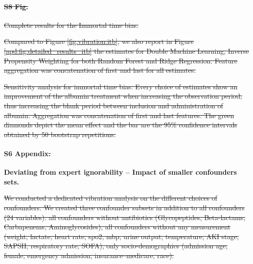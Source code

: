 \documentclass[10pt,letterpaper]{article}
\providecommand{\DIFdeltex}[1]{{\protect\color{red}\sout{#1}}}                      %
\providecommand{\DIFdelbegin}{} %
\providecommand{\DIFdelend}{} %
\providecommand{\DIFdelFL}[1]{\DIFdel{#1}} %
\providecommand{\DIFdel}[1]{\texorpdfstring{\DIFdeltex{#1}}{}} %
\newcommand{\DIFscaledelfig}{0.5}
\newlength{\DIFdelgraphicswidth} %
\newlength{\DIFdelgraphicsheight} %
\newcommand{\DIFdelincludegraphics}[2][]{%
\sbox{\DIFdelgraphicsbox}{\DIFOincludegraphics[#1]{#2}}%
\settoboxwidth{\DIFdelgraphicswidth}{\DIFdelgraphicsbox} %
\settoboxtotalheight{\DIFdelgraphicsheight}{\DIFdelgraphicsbox} %
\scalebox{\DIFscaledelfig}{%
\parbox[b]{\DIFdelgraphicswidth}{\usebox{\DIFdelgraphicsbox}\\[-\baselineskip] \rule{\DIFdelgraphicswidth}{0em}}\llap{\resizebox{\DIFdelgraphicswidth}{\DIFdelgraphicsheight}{%
\setlength{\unitlength}{\DIFdelgraphicswidth}%
\begin{picture}(1,1)%
\thicklines\linethickness{2pt} %
{\color[rgb]{1,0,0}\put(0,0){\framebox(1,1){}}}%
{\color[rgb]{1,0,0}\put(0,0){\line( 1,1){1}}}%
{\color[rgb]{1,0,0}\put(0,1){\line(1,-1){1}}}%
\end{picture}%
}\hspace*{3pt}}} %
} %
\DeclareRobustCommand{\DIFdelbegin}{\DIFOdelbegin \let\includegraphics\DIFdelincludegraphics} %
\DeclareRobustCommand{\DIFdelend}{\DIFOaddend \let\includegraphics\DIFOincludegraphics} %
\begin{document}
\paragraph*{\DIFdel{S8 Fig.}}
\DIFdel{Complete results for the Immortal time bias.}%

\DIFdel{Compared to Figure \ref{fig:vibration:itb}, we also report in Figure
  \ref{apd:fig:detailed_results_itb} the estimates for Double Machine Learning,
  Inverse Propensity Weighting for both Random Forest and Ridge Regression.
  Feature aggregation was concatenation of first and last for all estimates.
}%

{%
  \DIFdelFL{Sensitivity analysis for immortal time bias: Every choice of
    estimates show an improvement of the albumin treatment when increasing the
    observation period, thus increasing the blank period between inclusion and
    administration of albumin. Aggregation was concatenation of first and last
    features. The green diamonds depict the mean effect and the bar are the
    95\% confidence intervals obtained by 50 bootstrap
    repetitions.}}%
\DIFdelend

\paragraph*{S6 Appendix\DIFdelbegin \DIFdel{.}\DIFdelend }
\label{apd:vibration_analysis_for_confounders}
{\bf Deviating from expert ignorability -- Impact of smaller confounders sets.}

\DIFdelbegin \DIFdel{We conducted a dedicated vibration analysis on the different choices of
  confounders. We created three confounder subsets in addition to all
  confounders (24 variables): all confounders without antibiotics
  (Glycopeptides, Beta-lactams, Carbapenems, Aminoglycosides), all confounders
  without any measurement (weight, lactate, heart rate,
  spo2, mbp, urine output, temperature, AKI stage, SAPSII, respiratory rate, SOFA), only
  socio-demographics (admission age, female, emergency admission,
  insurance--medicare, race).
}%
\end{document}
